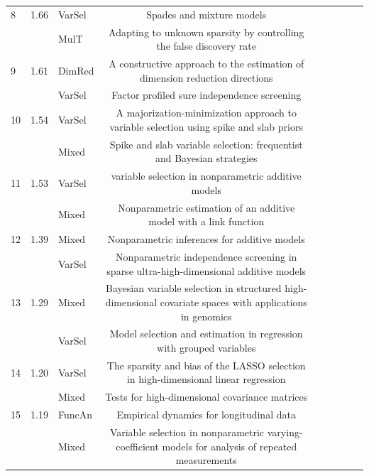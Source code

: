 \documentclass[AMS,STIX1COL]{WileyNJD-v2}
\begin{document}
\begin{landscape}
\begin{table}[t]
\begin{tabular}{lclclclcl}
8    & 1.66                      & VarSel    & Spades and mixture models & \\
     &                           & MulT      & Adapting to unknown sparsity by controlling the false discovery rate                          & \\
9    & 1.61                      & DimRed    & A constructive approach to the estimation of dimension reduction directions                   & \\
     &                           & VarSel    & Factor profiled sure independence screening & \\
10   & 1.54                      & VarSel    & A majorization-minimization approach to variable selection using spike and slab priors        & \\
     &                           & Mixed     & Spike and slab variable selection: frequentist and Bayesian strategies                        & \\
11   & 1.53                      & VarSel    & variable selection in nonparametric additive models & \\
     &                           & Mixed     & Nonparametric estimation of an additive model with a link function                            & \\
12   & 1.39                      & Mixed     & Nonparametric inferences for additive models & \\
     &                           & VarSel    & Nonparametric independence screening in sparse ultra-high-dimensional additive models         & \\
13   & 1.29                      & Mixed     & Bayesian variable selection in structured high-dimensional covariate spaces with applications in genomics & \\
     &                           & VarSel    & Model selection and estimation in regression with grouped variables                           & \\
14   & 1.20                      & VarSel    & The sparsity and bias of the LASSO selection in high-dimensional linear regression            & \\
     &                           & Mixed     & Tests for high-dimensional covariance matrices & \\
15   & 1.19                      & FuncAn    & Empirical dynamics for longitudinal data & \\
     &                           & Mixed     & Variable selection in nonparametric varying-coefficient models for analysis of repeated measurements   &       \\\hline
\end{tabular}
\end{table}
\end{landscape}




\end{document}
